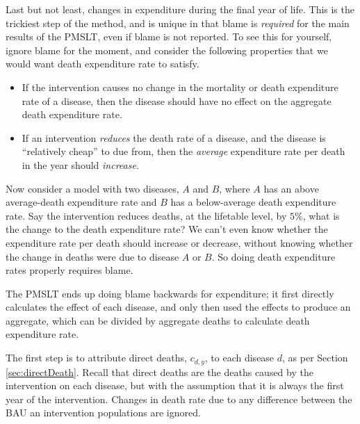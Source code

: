 \documentclass[]{article}
\begin{document}
Last but not least, changes in expenditure during the final year of life. This is the trickiest step of the method, and is unique in that blame is \textit{required} for the main results of the PMSLT, even if blame is not reported. To see this for yourself, ignore blame for the moment, and consider the following properties that we would want death expenditure rate to satisfy.
\begin{itemize}
	\item If the intervention causes no change in the mortality or death expenditure rate of a disease, then the disease should have no effect on the aggregate death expenditure rate.
	\item If an intervention \textit{reduces} the death rate of a disease, and the disease is ``relatively cheap'' to due from, then the \textit{average} expenditure rate per death in the year should \textit{increase}.
\end{itemize}
Now consider a model with two diseases, $A$ and $B$, where $A$ has an above average-death expenditure rate and $B$ has a below-average death expenditure rate. Say the intervention reduces deaths, at the lifetable level, by $5\%$, what is the change to the death expenditure rate? We can't even know whether the expenditure rate per death should increase or decrease, without knowing whether the change in deaths were due to disease $A$ or $B$. So doing death expenditure rates properly requires blame.

The PMSLT ends up doing blame backwards for expenditure; it first directly calculates the effect of each disease, and only then used the effects to produce an aggregate, which can be divided by aggregate deaths to calculate death expenditure rate.

The first step is to attribute direct deaths, $c_{d,y}$, to each disease $d$, as per Section \ref{sec:directDeath}. Recall that direct deaths are the deaths caused by the intervention on each disease, but with the assumption that it is always the first year of the intervention. Changes in death rate due to any difference between the BAU an intervention populations are ignored.
\end{document}
